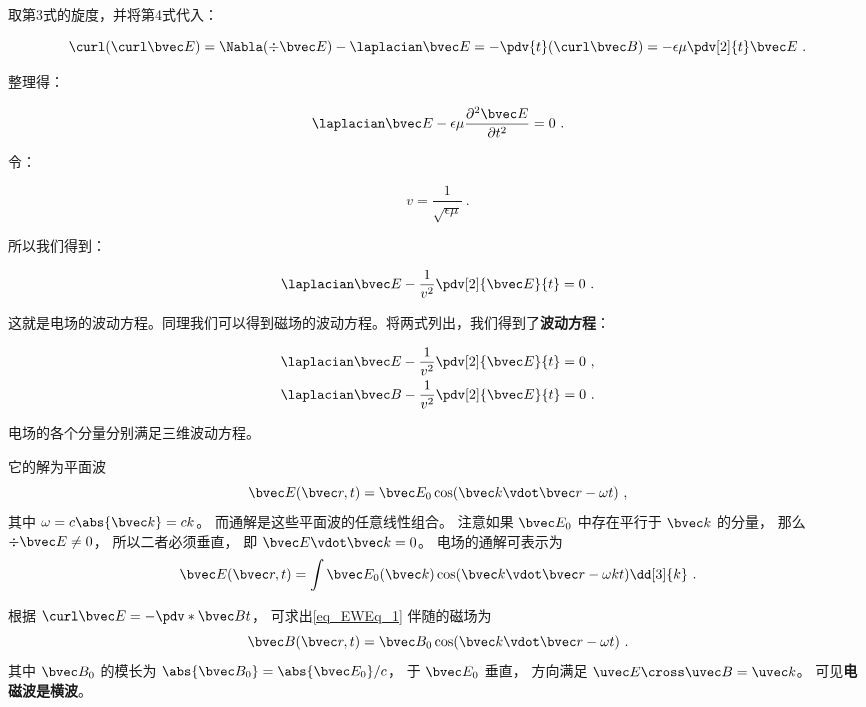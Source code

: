 取第3式的旋度，并将第4式代入：

\begin{equation}
\curl(\curl\bvec E) = \Nabla (\div \bvec E) - \laplacian \bvec E = -\pdv{t} (\curl\bvec B) = -\epsilon \mu \pdv[2]{t} \bvec E~.
\end{equation}

整理得：

\begin{equation}
\laplacian \bvec E - \epsilon \mu \frac{\partial^2 \bvec E}{\partial t^2} = 0 ~.
\end{equation}

令：

\begin{equation}
v = \frac{1}{\sqrt{\epsilon \mu}} ~.
\end{equation}

所以我们得到：

\begin{equation}
\laplacian \bvec E - \frac{1}{v^2} \pdv[2]{\bvec E}{t} = 0 ~.
\end{equation}

这就是电场的波动方程。同理我们可以得到磁场的波动方程。将两式列出，我们得到了\textbf{波动方程}：

\begin{equation}
\begin{aligned}
& \laplacian \bvec E - \frac{1}{v^2} \pdv[2]{\bvec E}{t} = 0 ~, \\
& \laplacian \bvec B - \frac{1}{v^2} \pdv[2]{\bvec E}{t} = 0 ~.
\end{aligned}
\end{equation}

电场的各个分量分别满足三维波动方程。%

它的解为平面波
\begin{equation}\label{eq_EWEq_1}
\bvec E(\bvec r, t) = \bvec E_0 \cos(\bvec k\vdot \bvec r - \omega t)~,
\end{equation}
其中 $\omega = c\abs{\bvec k} = ck$。 而通解是这些平面波的任意线性组合。 注意如果 $\bvec E_0$ 中存在平行于 $\bvec k$ 的分量， 那么 $\div \bvec E \ne 0$， 所以二者必须垂直， 即 $\bvec E \vdot \bvec k = 0$。 电场的通解可表示为
\begin{equation}
\bvec E(\bvec r, t) = \int \bvec E_0(\bvec k) \cos(\bvec k\vdot \bvec r - \omega k t) \dd[3]{k}~.
\end{equation}

根据 $\curl \bvec E = -\pdv*{\bvec B}{t}$， 可求出\autoref{eq_EWEq_1} 伴随的磁场为
\begin{equation}
\bvec B(\bvec r, t) = \bvec B_0 \cos(\bvec k \vdot \bvec r - \omega t)~.
\end{equation}
其中 $\bvec B_0$ 的模长为 $\abs{\bvec B_0} = \abs{\bvec E_0}/c$， 于 $\bvec E_0$ 垂直， 方向满足 $\uvec E \cross \uvec B = \uvec k$。 可见\textbf{电磁波是横波}。

